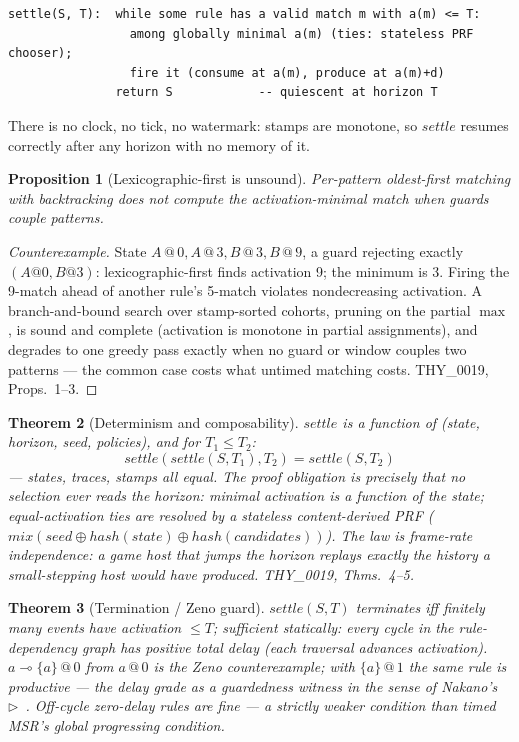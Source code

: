 \documentclass[11pt]{article}
\makeatletter
\newcommand{\lax}[2]{\{#1\}\mathbin{@}#2}       %
\newcommand{\loli}{\multimap}                    %
\newcommand{\stmp}[2]{#1\mathbin{@}#2}           %
\newcommand{\settle}{\mathit{settle}}
\newtheorem{theorem}{Theorem}[section]
\newtheorem{proposition}[theorem]{Proposition}
\theoremstyle{definition}
\theoremstyle{remark}
\makeatother
\begin{document}
\begin{verbatim}
settle(S, T):  while some rule has a valid match m with a(m) <= T:
                 among globally minimal a(m) (ties: stateless PRF chooser);
                 fire it (consume at a(m), produce at a(m)+d)
               return S            -- quiescent at horizon T
\end{verbatim}

\noindent There is no clock, no tick, no watermark: stamps are monotone, so
$\settle$ resumes correctly after any horizon with no memory of it.

\begin{proposition}[Lexicographic-first is unsound]
\label{prop:lex-unsound}
Per-pattern oldest-first matching with backtracking does not compute the
activation-minimal match when guards couple patterns.
\end{proposition}
\begin{proof}[Counterexample]
State $\stmp{A}{0}, \stmp{A}{3}, \stmp{B}{3}, \stmp{B}{9}$, a guard rejecting exactly
$(A@0, B@3)$: lexicographic-first finds activation 9; the minimum is 3.
Firing the 9-match ahead of another rule's 5-match violates nondecreasing
activation.  A branch-and-bound search over stamp-sorted cohorts, pruning on
the partial $\max$, is sound and complete (activation is monotone in partial
assignments), and degrades to one greedy pass exactly when no guard or window
couples two patterns --- the common case costs what untimed matching costs.
THY\_0019, Props.~1--3.
\end{proof}

\begin{theorem}[Determinism and composability]
\label{thm:composability}
$\settle$ is a function of (state, horizon, seed, policies), and for
$T_1 \leq T_2$:
\[
  \settle(\settle(S,T_1),T_2) = \settle(S,T_2)
\]
--- states, traces, stamps all equal.  The proof obligation is precisely that no
selection ever reads the horizon: minimal activation is a function of the state;
equal-activation ties are resolved by a \emph{stateless} content-derived PRF
($\mathit{mix}(\mathit{seed} \oplus \mathit{hash}(\mathit{state}) \oplus
\mathit{hash}(\mathit{candidates}))$).  The law is frame-rate independence: a
game host that jumps the horizon replays exactly the history a small-stepping
host would have produced.  THY\_0019, Thms.~4--5.
\end{theorem}

\begin{theorem}[Termination / Zeno guard]
\label{thm:termination}
$\settle(S,T)$ terminates iff finitely many events have activation $\leq T$;
sufficient statically: every cycle in the rule-dependency graph has positive
total delay (each traversal advances activation).  $a \loli \lax{a}{0}$ from
$\stmp{a}{0}$ is the Zeno counterexample; with $\lax{a}{1}$ the same rule is
productive --- the delay grade as a guardedness witness in the sense of
Nakano's~$\triangleright$~\cite{Nakano2000}.  Off-cycle zero-delay rules are
fine --- a strictly weaker condition than timed MSR's global progressing
condition.
\end{theorem}
\end{document}
